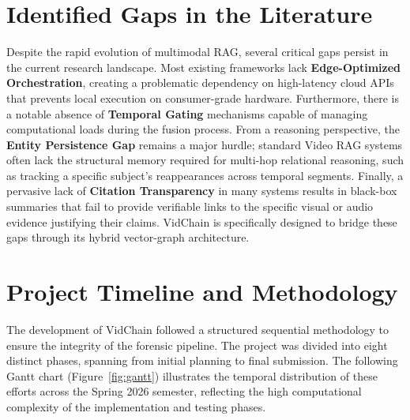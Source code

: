 \section{Identified Gaps in the Literature}
Despite the rapid evolution of multimodal RAG, several critical gaps persist in the current research landscape. Most existing frameworks lack \textbf{Edge-Optimized Orchestration}, creating a problematic dependency on high-latency cloud APIs that prevents local execution on consumer-grade hardware. Furthermore, there is a notable absence of \textbf{Temporal Gating} mechanisms capable of managing computational loads during the fusion process. From a reasoning perspective, the \textbf{Entity Persistence Gap} remains a major hurdle; standard Video RAG systems often lack the structural memory required for multi-hop relational reasoning, such as tracking a specific subject's reappearances across temporal segments. Finally, a pervasive lack of \textbf{Citation Transparency} in many systems results in black-box summaries that fail to provide verifiable links to the specific visual or audio evidence justifying their claims. VidChain is specifically designed to bridge these gaps through its hybrid vector-graph architecture.

\section{Project Timeline and Methodology}
\label{sec:timeline}

The development of VidChain followed a structured sequential methodology to ensure the integrity of the forensic pipeline. The project was divided into eight distinct phases, spanning from initial planning to final submission. The following Gantt chart (Figure~\ref{fig:gantt}) illustrates the temporal distribution of these efforts across the Spring 2026 semester, reflecting the high computational complexity of the implementation and testing phases.

